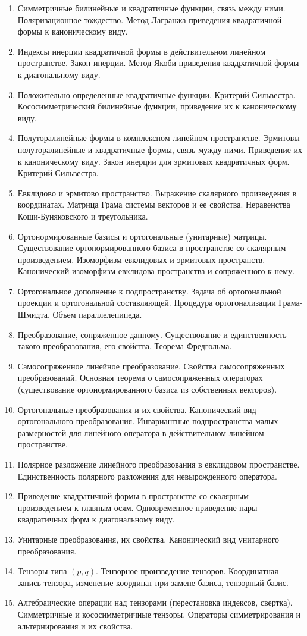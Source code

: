 \begin{enumerate}
    \item Симметричные билинейные и квадратичные функции, связь между ними. Поляризационное тождество. Метод Лагранжа приведения квадратичной формы к каноническому виду.
    \item Индексы инерции квадратичной формы в действительном линейном пространстве. Закон инерции. Метод Якоби приведения квадратичной формы к диагональному виду.
    \item Положительно определенные квадратичные функции. Критерий Сильвестра. Кососимметрический билинейные функции, приведение их к каноническому виду.
    \item Полуторалинейные формы в комплексном линейном пространстве. Эрмитовы полуторалинейные и квадратичные формы, связь мужду ними. Приведение их к каноническому виду. Закон инерции для эрмитовых квадратичных форм. Критерий Сильвестра.
    \item Евклидово и эрмитово пространство. Выражение скалярного произведения в координатах. Матрица Грама системы векторов и ее свойства. Неравенства Коши-Буняковского и треугольника.
    \item Ортонормированные базисы и ортогональные (унитарные) матрицы. Существование ортонормированного базиса в пространстве со скалярным произведением. Изоморфизм евклидовых и эрмитовых пространств. Канонический изоморфизм евклидова пространства и сопряженного к нему.
    \item Ортогональное дополнение к подпространству. Задача об ортогональной проекции и ортогональной составляющей. Процедура ортогонализации Грама-Шмидта. Объем параллелепипеда.
    \item Преобразование, сопряженное данному. Существование и единственность такого преобразования, его свойства. Теорема Фредгольма.
    \item Самосопряженное линейное преобразование. Свойства самосопряженных преобразований. Основная теорема о самосопряженных операторах (существование ортонормированного базиса из собственных векторов).
    \item Ортогональные преобразования и их свойства. Канонический вид ортогонального преобразования. Инвариантные подпространства малых размерностей для линейного оператора в действительном линейном пространстве.
    \item Полярное разложение линейного преобразования в евклидовом пространстве. Единственность полярного разложения для невырожденного оператора.
    \item Приведение квадратичной формы в пространстве со скалярным произведением к главным осям. Одновременное приведение пары квадратичных форм к диагональному виду.
    \item Унитарные преобразования, их свойства. Канонический вид унитарного преобразования.
    \item Тензоры типа $(p, q)$. Тензорное произведение тензоров. Координатная запись тензора, изменение координат при замене базиса, тензорный базис.
    \item Алгебраические операции над тензорами (перестановка индексов, свертка). Симметричные и кососимметричные тензоры. Операторы симметрирования и альтернирования и их свойства.
\end{enumerate}